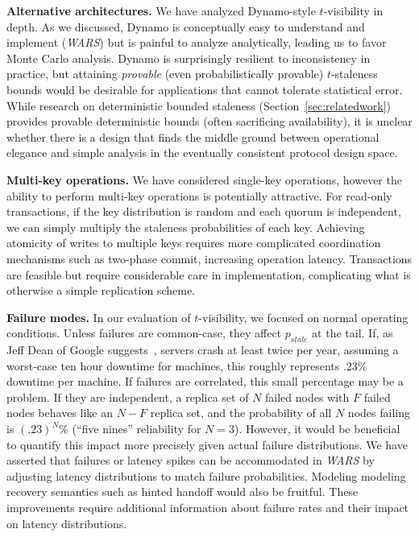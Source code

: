 \documentclass{vldb}
\begin{document}
\textbf{Alternative architectures.} We have analyzed Dynamo-style
$t$-visibility in depth.  As we discussed, Dynamo is conceptually easy
to understand and implement (\textit{WARS}) but is painful to analyze
analytically, leading us to favor Monte Carlo analysis.  Dynamo is
surprisingly resilient to inconsistency in practice, but attaining
\textit{provable} (even probabilistically provable) $t$-staleness
bounds would be desirable for applications that cannot tolerate
statistical error.  While research on deterministic bounded staleness
(Section~\ref{sec:relatedwork}) provides provable deterministic bounds
(often sacrificing availability), it is unclear whether there is a
design that finds the middle ground between operational elegance and
simple analysis in the eventually consistent protocol design space.

\textbf{Multi-key operations.} We have considered single-key
operations, however the ability to perform multi-key operations is
potentially attractive.  For read-only transactions, if the key
distribution is random and each quorum is independent, we can simply
multiply the staleness probabilities of each key.  Achieving atomicity
of writes to multiple keys requires more complicated coordination
mechanisms such as two-phase commit, increasing operation latency.
Transactions are feasible but require considerable care in
implementation, complicating what is otherwise a simple replication
scheme.

\textbf{Failure modes.} In our evaluation of $t$-visibility, we
focused on normal operating conditions. Unless failures are
common-case, they affect $p_{stale}$ at the tail.  If, as Jeff Dean of
Google suggests~\cite{dean-keynote}, servers crash at least twice per
year, assuming a worst-case ten hour downtime for machines, this
roughly represents .23\% downtime per machine.  If failures are
correlated, this small percentage may be a problem.  If they are
independent, a replica set of $N$ failed nodes with $F$ failed nodes
behaves like an $N-F$ replica set, and the probability of all $N$
nodes failing is $(.23)^N$\% (``five nines'' reliability for
$N$$=$$3$).  However, it would be beneficial to quantify this impact
more precisely given actual failure distributions.  We have asserted
that failures or latency spikes can be accommodated in \textit{WARS}
by adjusting latency distributions to match failure probabilities.
Modeling modeling recovery semantics such as hinted handoff would also
be fruitful.  These improvements require additional information about
failure rates and their impact on latency distributions.
\end{document}
